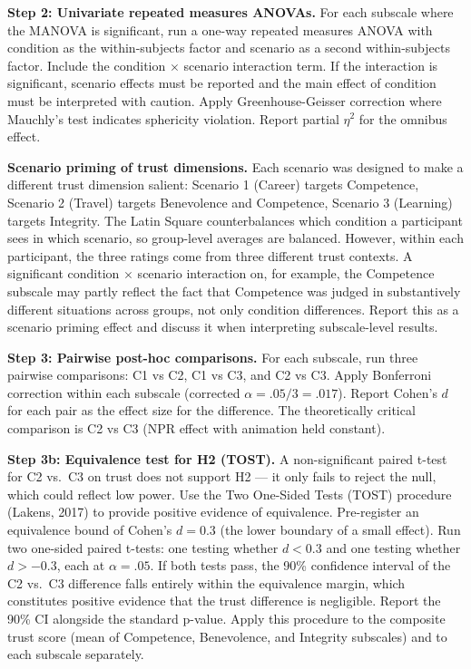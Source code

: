 \documentclass[11pt, a4paper]{article}
\begin{document}
\textbf{Step 2: Univariate repeated measures ANOVAs.} For each subscale where the MANOVA is significant, run a one-way repeated measures ANOVA with condition as the within-subjects factor and scenario as a second within-subjects factor. Include the condition $\times$ scenario interaction term. If the interaction is significant, scenario effects must be reported and the main effect of condition must be interpreted with caution. Apply Greenhouse-Geisser correction where Mauchly's test indicates sphericity violation. Report partial $\eta^2$ for the omnibus effect.

\begin{infobox}
\small\textbf{Scenario priming of trust dimensions.} Each scenario was designed to make a different trust dimension salient: Scenario 1 (Career) targets Competence, Scenario 2 (Travel) targets Benevolence and Competence, Scenario 3 (Learning) targets Integrity. The Latin Square counterbalances which condition a participant sees in which scenario, so group-level averages are balanced. However, within each participant, the three ratings come from three different trust contexts. A significant condition $\times$ scenario interaction on, for example, the Competence subscale may partly reflect the fact that Competence was judged in substantively different situations across groups, not only condition differences. Report this as a scenario priming effect and discuss it when interpreting subscale-level results.
\end{infobox}

\textbf{Step 3: Pairwise post-hoc comparisons.} For each subscale, run three pairwise comparisons: C1 vs C2, C1 vs C3, and C2 vs C3. Apply Bonferroni correction within each subscale (corrected $\alpha = .05/3 = .017$). Report Cohen's $d$ for each pair as the effect size for the difference. The theoretically critical comparison is C2 vs C3 (NPR effect with animation held constant).

\textbf{Step 3b: Equivalence test for H2 (TOST).} A non-significant paired t-test for C2 vs.\ C3 on trust does not support H2 — it only fails to reject the null, which could reflect low power. Use the Two One-Sided Tests (TOST) procedure (Lakens, 2017) to provide positive evidence of equivalence. Pre-register an equivalence bound of Cohen's $d = 0.3$ (the lower boundary of a small effect). Run two one-sided paired t-tests: one testing whether $d < 0.3$ and one testing whether $d > -0.3$, each at $\alpha = .05$. If both tests pass, the 90\% confidence interval of the C2 vs.\ C3 difference falls entirely within the equivalence margin, which constitutes positive evidence that the trust difference is negligible. Report the 90\% CI alongside the standard p-value. Apply this procedure to the composite trust score (mean of Competence, Benevolence, and Integrity subscales) and to each subscale separately.
\end{document}
